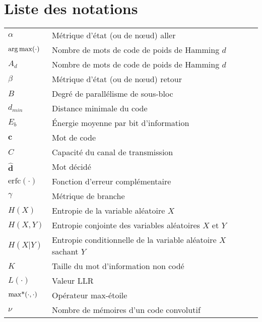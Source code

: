 \chapter*{Liste des notations}
\begin{center}

\begin{longtable}{ p{}  p{} } 

$\alpha$       			&	Métrique d'état (ou de nœud) aller 				  										\\
$\operatorname*{arg\,max}(\cdot)$       	&	Nombre de mots de code de poids de Hamming $d$  										\\
$A_d$       	 		&	Nombre de mots de code de poids de Hamming $d$  										\\
$\beta$       			&	Métrique d'état (ou de nœud) retour				  										\\
$B$       	        	&   Degré de parallélisme de sous-bloc    													\\
$d_{min}$    	 		&	Distance minimale du code        														\\
$E_b$         	 		&	Énergie moyenne par bit d'information     												\\
$\mathbf{c}$			& 	Mot de code 																			\\
$C$						& 	Capacité du canal de transmission														\\
$\mathbf{\hat{d}}$		&	Mot décidé																				\\
$\text{erfc}(\cdot)$    &	Fonction d'erreur complémentaire     													\\
$\gamma$       			&	Métrique de branche				 				  										\\
$H(X)$					& 	Entropie de la variable aléatoire $X$													\\
$H(X,Y)$				& 	Entropie conjointe des variables aléatoires $X$ et $Y$									\\
$H(X|Y)$				& 	Entropie conditionnelle de la variable aléatoire $X$ sachant $Y$						\\
$K$     	  			&	Taille du mot d'information non codé     												\\
$L(\cdot)$				&	Valeur LLR 																				\\
$\operatorname*{max*}(\cdot,\cdot)$ & 	Opérateur max-étoile																	\\
$\nu$					& 	Nombre de mémoires d'un code convolutif													\\

\end{longtable}
\end{center}
